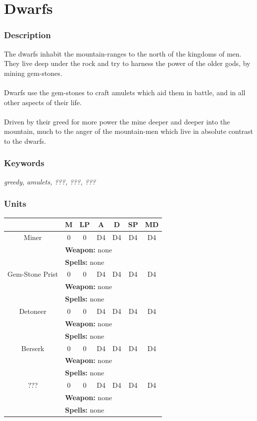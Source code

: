 \documentclass[a5paper,pagesize,10pt,bibtotoc,pointlessnumbers,
normalheadings,DIV=9,twoside=false]{scrbook}
\begin{document}
\newpage
\section{Dwarfs}

\subsubsection{Description}

The dwarfs inhabit the mountain-ranges to the north of the kingdoms of men. They live deep under the rock and try to harness the power of the older gods, by mining gem-stones.\\
\\
Dwarfs use the gem-stones to craft amulets which aid them in battle, and in all other aspects of their life.\\
\\
Driven by their greed for more power the mine deeper and deeper into the mountain, much to the anger of the mountain-men which live in absolute contrast to the dwarfs.

\subsubsection{Keywords}
\emph{greedy, amulets, ???, ???, ???}

\subsubsection{Units}

 \begin{tabular}{||c c c c c c c||} 
 \hline
  & M & LP & A & D & SP & MD \\
 \hline\hline
 Miner & 0 & 0 & D4 & D4 & D4 & D4 \\ 
  & \multicolumn{6}{l||}{\textbf{Weapon:} none} \\
  & \multicolumn{6}{l||}{\textbf{Spells:} none} \\
 \hline
 Gem-Stone Prist & 0 & 0 & D4 & D4 & D4 & D4 \\
  & \multicolumn{6}{l||}{\textbf{Weapon:} none} \\
  & \multicolumn{6}{l||}{\textbf{Spells:} none} \\
 \hline
 Detoneer & 0 & 0 & D4 & D4 & D4 & D4 \\
  & \multicolumn{6}{l||}{\textbf{Weapon:} none} \\
  & \multicolumn{6}{l||}{\textbf{Spells:} none} \\
\hline
 Berserk & 0 & 0 & D4 & D4 & D4 & D4 \\
  & \multicolumn{6}{l||}{\textbf{Weapon:} none} \\
  & \multicolumn{6}{l||}{\textbf{Spells:} none} \\
\hline
 ??? & 0 & 0 & D4 & D4 & D4 & D4 \\
  & \multicolumn{6}{l||}{\textbf{Weapon:} none} \\
  & \multicolumn{6}{l||}{\textbf{Spells:} none} \\
\hline
\end{tabular}
\end{document}
